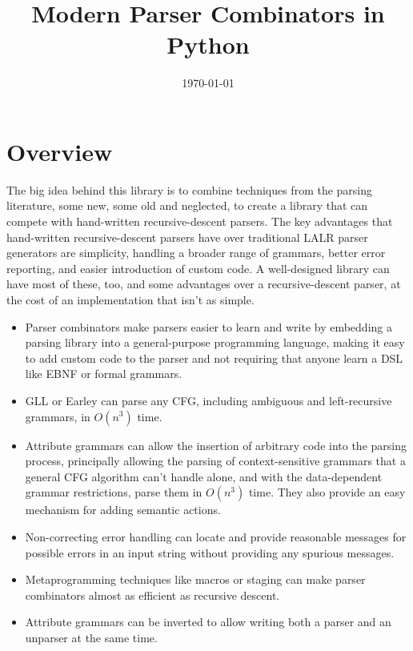 \documentclass[12pt]{article}
\title{Modern Parser Combinators in Python}
\date{\today}
\begin{document}
\maketitle

\section{Overview}
\label{sec:overview}

The big idea behind this library is to combine techniques from the
parsing literature, some new, some old and neglected, to create a
library that can compete with hand-written recursive-descent parsers.
The key advantages that hand-written recursive-descent parsers have
over traditional LALR parser generators are simplicity, handling a
broader range of grammars, better error reporting, and easier
introduction of custom code.  A well-designed library can have most of
these, too, and some advantages over a recursive-descent parser, at
the cost of an implementation that isn't as simple.

\begin{itemize}
\item Parser combinators make parsers easier to learn and write by
  embedding a parsing library into a general-purpose programming
  language, making it easy to add custom code to the parser and not
  requiring that anyone learn a DSL like EBNF or formal grammars.
\item GLL or Earley can parse any CFG, including ambiguous and
  left-recursive grammars, in $O(n^3)$ time.  %
\item Attribute grammars can allow the insertion of arbitrary code
  into the parsing process, principally allowing the parsing of
  context-sensitive grammars that a general CFG algorithm can't handle
  alone, and with the data-dependent grammar restrictions, parse them
  in $O(n^3)$ time.  They also provide an easy mechanism for adding
  semantic actions.
\item Non-correcting error handling can locate and provide reasonable
  messages for possible errors in an input string without
  providing any spurious messages.
\item Metaprogramming techniques like macros or staging can make
  parser combinators almost as efficient as recursive descent.
\item Attribute grammars can be inverted to allow writing both a
  parser and an unparser at the same time.
\end{itemize}
\end{document}

